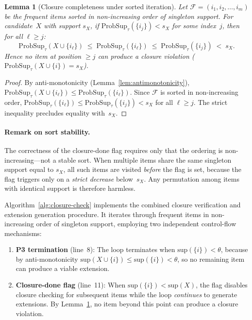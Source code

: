 \documentclass[10pt,letterpaper]{article}
\newtheorem{lemma}{Lemma}
\begin{document}
\begin{lemma}[Closure completeness under sorted iteration]
\label{lem:closure_completeness}
Let $\mathcal{F} = (i_1, i_2, \ldots, i_m)$ be the frequent items sorted in non-increasing order of singleton support. For candidate~$X$ with support $s_X$, if $\mathrm{ProbSup}_{\tau}(\{i_j\}) < s_X$ for some index~$j$, then for all $\ell \ge j$:
\[
\mathrm{ProbSup}_{\tau}(X \cup \{i_\ell\}) \;\le\; \mathrm{ProbSup}_{\tau}(\{i_\ell\}) \;\le\; \mathrm{ProbSup}_{\tau}(\{i_j\}) \;< \;s_X.
\]
Hence no item at position $\ge j$ can produce a closure violation ($\mathrm{ProbSup}_{\tau}(X \cup \{i\}) = s_X$).
\end{lemma}

\begin{proof}
By anti-monotonicity (Lemma~\ref{lem:antimonotonicity}), $\mathrm{ProbSup}_{\tau}(X \cup \{i_\ell\}) \le \mathrm{ProbSup}_{\tau}(\{i_\ell\})$. Since $\mathcal{F}$ is sorted in non-increasing order, $\mathrm{ProbSup}_{\tau}(\{i_\ell\}) \le \mathrm{ProbSup}_{\tau}(\{i_j\}) < s_X$ for all $\ell \ge j$. The strict inequality precludes equality with~$s_X$.
\end{proof}

\paragraph{Remark on sort stability.} The correctness of the closure-done flag requires only that the ordering is non-increasing---not a stable sort. When multiple items share the same singleton support equal to $s_X$, all such items are visited \emph{before} the flag is set, because the flag triggers only on a \emph{strict decrease} below~$s_X$. Any permutation among items with identical support is therefore harmless.

Algorithm~\ref{alg:closure-check} implements the combined closure verification and extension generation procedure. It iterates through frequent items in non-increasing order of singleton support, employing two independent control-flow mechanisms:

\begin{enumerate}
    \item \textbf{P3 termination} (line~8): The loop terminates when $\mathrm{sup}(\{i\}) < \theta$, because by anti-monotonicity $\mathrm{sup}(X \cup \{i\}) \le \mathrm{sup}(\{i\}) < \theta$, so no remaining item can produce a viable extension.
    
    \item \textbf{Closure-done flag} (line~11): When $\mathrm{sup}(\{i\}) < \mathrm{sup}(X)$, the flag disables closure checking for subsequent items while the loop \emph{continues} to generate extensions. By Lemma~\ref{lem:closure_completeness}, no item beyond this point can produce a closure violation.
\end{enumerate}
\end{document}
